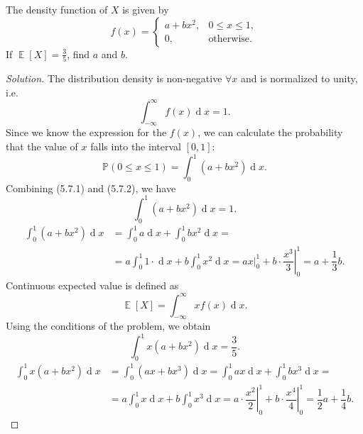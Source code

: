 \documentclass{article}[12pt]
\newenvironment{solution}
  {\renewcommand\qedsymbol{$\blacksquare$}\begin{proof}[Solution]}
  {\end{proof}}
\newenvironment{problem}[1]
  {\renewcommand\theinnercustomprblm{#1}\innercustomprblm}
  {\endinnercustomprblm}
\DeclareMathOperator{\dif}{d}
\DeclareMathOperator{\E}{\mathbb{E}}
\renewcommand{\P}{\mathbb{P}}
\begin{document}
\begin{problem}{5.7}\normalfont
The density function of $X$ is given by
\begin{equation*}
    f(x) =
    \begin{cases}
    a + bx^{2},& 0 \leqslant x \leqslant 1,
    \\
    0, &\text{otherwise.}
    \end{cases}
\end{equation*}
If $\E[X] = \tfrac{3}{5}$, find $a$ and $b$.
\end{problem}
\begin{solution}
The distribution density is non-negative $\forall x$ and is normalized to unity, i.e.
\begin{equation*}
    \int_{-\infty}^{\infty}f(x)\dif x = 1.\tag{5.7.1}
\end{equation*}
Since we know the expression for the $f(x)$, we can calculate the probability that the value of $x$ falls into the interval $[0, 1]$:
\begin{equation*}
    \P(0\leqslant x\leqslant 1) = \int_{0}^{1}\left(a + bx^{2}\right)\dif x.\tag{5.7.2}
\end{equation*}
Combining (5.7.1) and (5.7.2), we have
\begin{equation*}
    \int_{0}^{1}\left(a + bx^{2}\right)\dif x = 1.
\end{equation*}
\begin{align*}
    \int_{0}^{1}\left(a + bx^{2}\right)\dif x &= \int_{0}^{1}a\dif x + \int_{0}^{1}bx^{2}\dif x =
    \\
    &= a\int_{0}^{1}1\cdot\dif x + b\int_{0}^{1}x^{2}\dif x = ax\Big|_{0}^{1} + b\cdot\left.\dfrac{x^{3}}{3}\right|_{0}^{1} =  a + \dfrac{1}{3}b.\tag{5.7.3}
\end{align*}
Continuous expected value is defined as
\begin{equation*}
    \E[X] = \int_{-\infty}^{\infty}xf(x)\dif x.
\end{equation*}
Using the conditions of the problem, we obtain
\begin{equation*}
    \int_{0}^{1}x(a + bx^{2})\dif x = \dfrac{3}{5}.
\end{equation*}
\begin{align*}
    \int_{0}^{1}x(a + bx^{2})\dif x &=\int_{0}^{1}(ax + bx^{3})\dif x =\int_{0}^{1}ax\dif x + \int_{0}^{1}bx^{3}\dif x =
    \\
    &= a\int_{0}^{1}x\dif x + b\int_{0}^{1}x^{3}\dif x = a\cdot\left.\dfrac{x^{2}}{2}\right|_{0}^{1} + b\cdot\left.\dfrac{x^{4}}{4}\right|_{0}^{1} = \dfrac{1}{2}a + \dfrac{1}{4}b.\tag{5.7.4}

\end{align*}
\end{solution}
\end{document}
